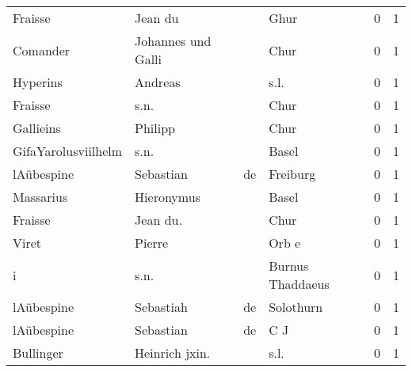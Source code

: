 \begin{tabular}{llllrr}
                  Fraisse &                            Jean du &             &                                        Ghur &          0 &         1 \\
                 Comander &                 Johannes und Galli &             &                                        Chur &          0 &         1 \\
                 Hyperins &                            Andreas &             &                                        s.l. &          0 &         1 \\
                  Fraisse &                               s.n. &             &                                        Chur &          0 &         1 \\
                Gallieins &                            Philipp &             &                                        Chur &          0 &         1 \\
      GifaYarolusviilhelm &                               s.n. &             &                                       Basel &          0 &         1 \\
               lAübespine &                          Sebastian &          de &                                    Freiburg &          0 &         1 \\
                Massarius &                         Hieronymus &             &                                       Basel &          0 &         1 \\
                  Fraisse &                           Jean du. &             &                                        Chur &          0 &         1 \\
                    Viret &                             Pierre &             &                                       Orb e &          0 &         1 \\
                        i &                               s.n. &             &                            Burnus Thaddaeus &          0 &         1 \\
               lAübespine &                          Sebastiah &          de &                                   Solothurn &          0 &         1 \\
               lAübespine &                          Sebastian &          de &                                         C J &          0 &         1 \\
                Bullinger &                     Heinrich jxin. &             &                                        s.l. &          0 &         1 \\

\end{tabular}
